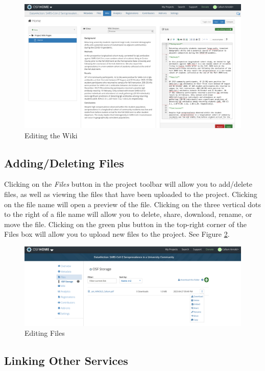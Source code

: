 \documentclass{scrartcl}
\begin{document}
\begin{figure}[!htb]
    \includegraphics[width=\textwidth]{wiki-edit.png}
    \caption{Editing the Wiki}
    \label{fig:wiki-edit}
\end{figure}

\subsection{Adding/Deleting Files}

Clicking on the \emph{Files} button in the project toolbar will allow you to add/delete files, as well as viewing the files that have been uploaded to the project.
Clicking on the file name will open a preview of the file.
Clicking on the three vertical dots to the right of a file name will allow you to delete, share, download, rename, or move the file.
Clicking on the green plus button in the top-right corner of the Files box will allow you to upload new files to the project.
See Figure \ref{fig:file-edit}.

\begin{figure}[!htb]
    \includegraphics[width=\textwidth]{file-edit.png}
    \caption{Editing Files}
    \label{fig:file-edit}
\end{figure}

\subsection{Linking Other Services}
\label{sec:linking-services}
\end{document}
